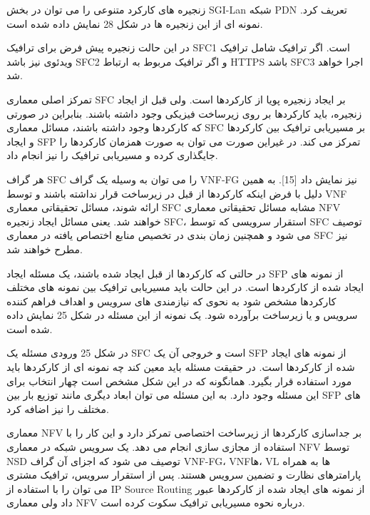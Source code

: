 زنجیره های کارکرد متنوعی را  می توان در بخش SGI-Lan شبکه PDN تعریف کرد. نمونه ای از این زنجیره ها در شکل 28 نمایش داده شده است.

در این حالت زنجیره پیش فرض برای ترافیک SFC1 است. اگر ترافیک شامل ترافیک ویدئوی نیز باشد SFC2 و اگر ترافیک مربوط به ارتباط HTTPS باشد SFC3 اجرا خواهد شد.


تمرکز اصلی معماری SFC بر ایجاد زنجیره پویا از کارکردها است. ولی قبل از ایجاد زنجیره، باید کارکردها بر روی زیرساخت فیزیکی وجود داشته باشند. بنابراین در صورتی که کارکردها وجود داشته باشند، مسائل معماری SFC بر مسیریابی ترافیک بین کارکردها و ایجاد SFP تمرکز می کند. در غیراین صورت می توان به صورت همزمان کارکردها را جایگذاری کرده و مسیریابی ترافیک را نیز انجام داد.

هر گراف SFC را می توان به وسیله یک گراف VNF-FG نیز نمایش داد [15]. به همین دلیل با فرض اینکه کارکردها از قبل در زیرساخت قرار نداشته باشند و توسط VNF ارائه شوند، مسائل تحقیقاتی معماری SFC مشابه مسائل تحقیقاتی معماری NFV خواهند شد. یعنی مسائل ایجاد زنجیره SFC، استقرار سرویسی که توسط SFC توصیف می شود و همچنین زمان بندی در تخصیص منابع اختصاص یافته در معماری SFC نیز مطرح خواهند شد.

در حالتی که کارکردها از قبل ایجاد شده باشند، یک مسئله ایجاد SFP از نمونه های ایجاد شده از کارکردها است. در این حالت باید مسیریابی ترافیک بین نمونه های مختلف کارکردها مشخص شود به نحوی که نیازمندی های سرویس و اهداف فراهم کننده سرویس و یا زیرساخت برآورده شود. یک نمونه از این مسئله در شکل 25 نمایش داده شده است.

در شکل 25 ورودی مسئله یک SFC است و خروجی آن یک SFP از نمونه های ایجاد شده از کارکردها است. در حقیقت مسئله باید معین کند چه نمونه ای از کارکردها باید مورد استفاده قرار بگیرد. همانگونه که در این شکل مشخص است چهار انتخاب برای این مسئله وجود دارد. به این مسئله می توان ابعاد دیگری مانند توزیع بار بین SFP های مختلف را نیز اضافه کرد.


معماری NFV بر جداسازی کارکردها از زیرساخت اختصاصی تمرکز دارد و این کار را با استفاده از مجازی سازی انجام می دهد. یک سرویس شبکه در معماری NFV توسط NSD توصیف می شود که اجزای آن گراف VNF-FG، VNFها، VL ها به همراه پارامترهای نظارت و تضمین سرویس هستند. پس از استقرار سرویس، ترافیک مشتری می توان را با استفاده از IP Source Routing از نمونه های ایجاد شده از کارکردها عبور داد ولی معماری NFV درباره نحوه مسیریابی ترافیک سکوت کرده است.

